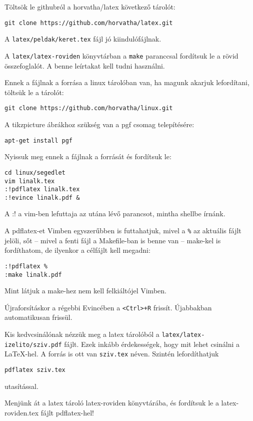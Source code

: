 \documentclass[a4paper]{article}
\newcommand{\code}{\texttt}
\begin{document}
Töltsök le githubról a horvatha/latex következő tárolót:

\begin{Verbatim}
git clone https://github.com/horvatha/latex.git
\end{Verbatim}

A \verb!latex/peldak/keret.tex! fájl jó kiindulófájlnak.

A \verb!latex/latex-roviden! könyvtárban a \verb!make! paranccsal
fordítsuk le a rövid összefoglalót. A benne leírtakat kell tudni
használni.

Ennek a fájlnak a forrása a linux tárolóban van, ha magunk akarjuk
lefordítani, töltsük le a tárolót:

\begin{Verbatim}
git clone https://github.com/horvatha/linux.git
\end{Verbatim}

A tikzpicture ábrákhoz szükség van a pgf csomag telepítésére:

\begin{Verbatim}
apt-get install pgf
\end{Verbatim}

Nyissuk meg ennek a fájlnak a forrását és fordítsuk le:
\begin{Verbatim}
cd linux/segedlet
vim linalk.tex
:!pdflatex linalk.tex
:!evince linalk.pdf &
\end{Verbatim}
A :! a vim-ben lefuttaja az utána lévő parancsot, mintha shellbe írnánk.

A pdflatex-et Vimben egyszerűbben is futtahatjuk, mivel a \verb!%! az
aktuális fájlt jelöli, sőt -- mivel a fenti fájl a Makefile-ban is benne
van -- make-kel is fordíthatom, de ilyenkor a célfájlt kell megadni:
\begin{Verbatim}
:!pdflatex %
:make linalk.pdf
\end{Verbatim}
Mint látjuk a make-hez nem kell felkiáltójel Vimben.

Újraforsításkor a régebbi Evincében a \verb!<Ctrl>+R! frissít.
Újabbakban automatikusan frissül.

Kis kedvcsinálónak nézzük meg a latex tárolóból a
\code{latex/latex-izelito/sziv.pdf} fájlt.
Ezek inkább érdekességek, hogy mit lehet csinálni a \LaTeX-hel.
A forrás is ott van \code{sziv.tex} néven. Szintén lefordíthatjuk

\verb"pdflatex sziv.tex"

utasítással.

Menjünk át a latex tároló latex-roviden könyvtárába, és fordítsuk le a
latex-roviden.tex fájlt pdflatex-hel!
\end{document}
